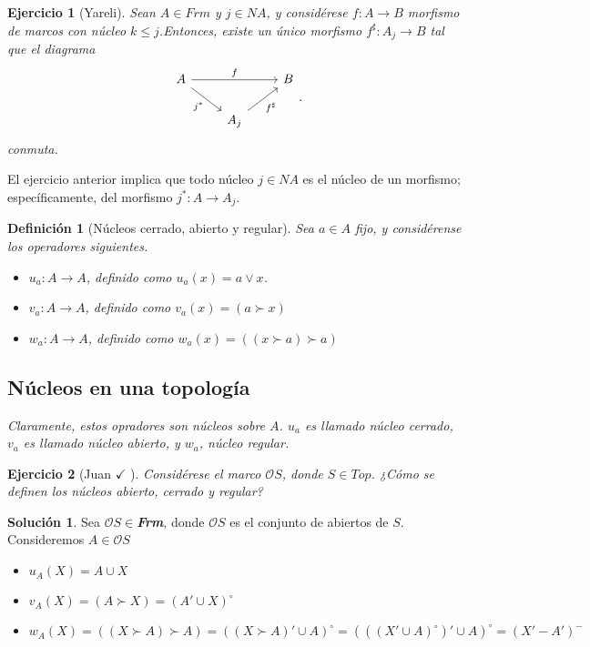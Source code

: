 \documentclass[12pt,letterpaper,titlepage]{article}
\newtheorem*{defn}{Definición}
\newtheorem{exe}{Ejercicio}
\theoremstyle{definition}
\newtheorem*{sol}{Solución}
\renewcommand\sup{\vee}
\renewcommand\cal[1]{\mathcal{#1}}
\newcommand\<{\langle}
\renewcommand\>{\rangle}
\begin{document}
\begin{exe}[Yareli]
Sean $A\in Frm$ y $j\in NA$, y considérese $f:A\to B$ morfismo de marcos con núcleo $k\leq j$.Entonces, existe un único morfismo $f^{\sharp}:A_j \to B$ tal que el diagrama
\[
        \begin{tikzcd}
            A \ar[rr,"f"] \ar[dr,"j^*"'] &&  B \\
            &A_j \ar[ur,"f^\sharp"']
        \end{tikzcd}
    .\]
conmuta.
\end{exe}
El ejercicio anterior implica que todo núcleo $j\in NA$ es el núcleo de un morfismo; específicamente, del morfismo $j^*:A\to A_j$.
\begin{defn}[Núcleos cerrado, abierto y regular]
Sea $a\in A$ fijo, y considérense los operadores siguientes.
\begin{itemize}
\item $u_a:A\to A$, definido como $u_a(x)= a\sup x$.
\item $v_a:A\to A$, definido como $v_a(x)=(a\succ x)$
\item $w_a:A\to A$, definido como $w_a(x)=((x\succ a)\succ a)$
\end{itemize}

\subsection{Núcleos en una topología}

Claramente, estos opradores son núcleos sobre $A$. $u_a$ es llamado núcleo cerrado, $v_a$ es llamado núcleo abierto, y $w_a$, núcleo regular.
\end{defn}
\begin{exe}[Juan $\checkmark$ ]
Considérese el marco $\cal O S$, donde $S\in Top$. ¿Cómo se definen los núcleos abierto, cerrado y regular?
\end{exe}

\begin{sol}
    Sea $\mathcal{O}S\in $\textbf{\textit{Frm}}, donde $\mathcal{O}S$ es el conjunto de abiertos de $S$. Consideremos $A\in \mathcal{O}S$
    
    \begin{itemize}
        \item $u_A(X)=A\cup X$
        \item $v_A(X)=(A\succ X)=(A'\cup X)^\circ$
        \item $w_A(X)=((X\succ A)\succ A)=((X\succ A)'\cup A)^\circ=(((X'\cup A)^\circ)'\cup A)^\circ=(X'-A')^-$
    \end{itemize}
\end{sol}
\end{document}
